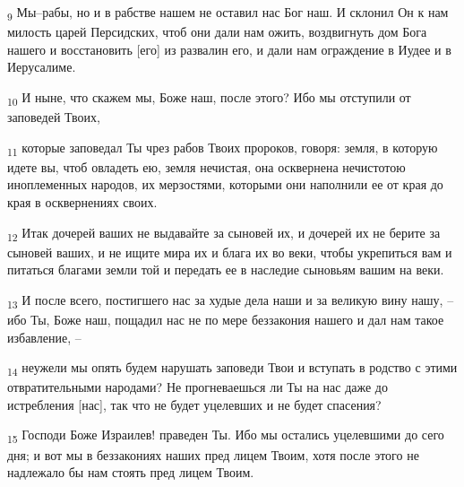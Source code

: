 \begin{tcolorbox}
\textsubscript{9} Мы--рабы, но и в рабстве нашем не оставил нас Бог наш. И склонил Он к нам милость царей Персидских, чтоб они дали нам ожить, воздвигнуть дом Бога нашего и восстановить [его] из развалин его, и дали нам ограждение в Иудее и в Иерусалиме.
\end{tcolorbox}
\begin{tcolorbox}
\textsubscript{10} И ныне, что скажем мы, Боже наш, после этого? Ибо мы отступили от заповедей Твоих,
\end{tcolorbox}
\begin{tcolorbox}
\textsubscript{11} которые заповедал Ты чрез рабов Твоих пророков, говоря: земля, в которую идете вы, чтоб овладеть ею, земля нечистая, она осквернена нечистотою иноплеменных народов, их мерзостями, которыми они наполнили ее от края до края в осквернениях своих.
\end{tcolorbox}
\begin{tcolorbox}
\textsubscript{12} Итак дочерей ваших не выдавайте за сыновей их, и дочерей их не берите за сыновей ваших, и не ищите мира их и блага их во веки, чтобы укрепиться вам и питаться благами земли той и передать ее в наследие сыновьям вашим на веки.
\end{tcolorbox}
\begin{tcolorbox}
\textsubscript{13} И после всего, постигшего нас за худые дела наши и за великую вину нашу, --ибо Ты, Боже наш, пощадил нас не по мере беззакония нашего и дал нам такое избавление, --
\end{tcolorbox}
\begin{tcolorbox}
\textsubscript{14} неужели мы опять будем нарушать заповеди Твои и вступать в родство с этими отвратительными народами? Не прогневаешься ли Ты на нас даже до истребления [нас], так что не будет уцелевших и не будет спасения?
\end{tcolorbox}
\begin{tcolorbox}
\textsubscript{15} Господи Боже Израилев! праведен Ты. Ибо мы остались уцелевшими до сего дня; и вот мы в беззакониях наших пред лицем Твоим, хотя после этого не надлежало бы нам стоять пред лицем Твоим.
\end{tcolorbox}
